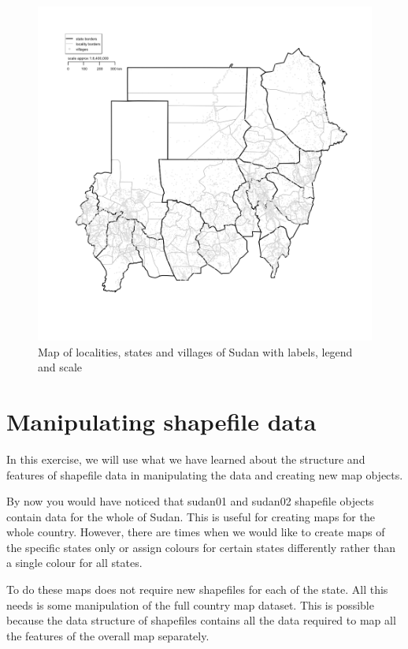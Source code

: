 \documentclass[12pt,a4paper,a4paper]{book}
\theoremstyle{definition}
\theoremstyle{definition}
\theoremstyle{definition}
\theoremstyle{remark}
\begin{document}
\begin{figure}[H]

{\centering \includegraphics{figures/map8-1} 

}

\caption{Map of localities, states and villages of Sudan with labels, legend and scale}\label{fig:map8}
\end{figure}

\hypertarget{exercise3}{%
\chapter{Manipulating shapefile data}\label{exercise3}}

In this exercise, we will use what we have learned about the structure
and features of shapefile data in manipulating the data and creating new
map objects.

By now you would have noticed that sudan01 and sudan02 shapefile objects
contain data for the whole of Sudan. This is useful for creating maps
for the whole country. However, there are times when we would like to
create maps of the specific states only or assign colours for certain
states differently rather than a single colour for all states.

To do these maps does not require new shapefiles for each of the state.
All this needs is some manipulation of the full country map dataset.
This is possible because the data structure of shapefiles contains all
the data required to map all the features of the overall map separately.
\end{document}
